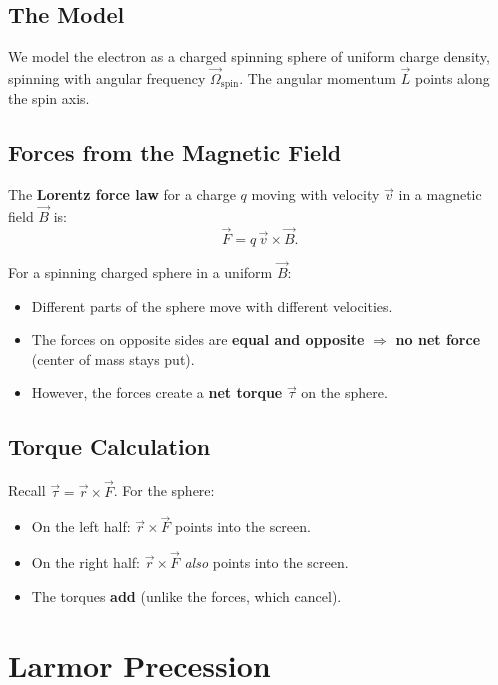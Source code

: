 \documentclass[11pt,a4paper]{article}
\theoremstyle{definition}
\theoremstyle{plain}
\theoremstyle{remark}
\begin{document}
\subsection{The Model}

We model the electron as a charged spinning sphere of uniform charge density, spinning with angular frequency $\vec{\Omega}_{\text{spin}}$. The angular momentum $\vec{L}$ points along the spin axis.

\subsection{Forces from the Magnetic Field}

The \textbf{Lorentz force law} for a charge $q$ moving with velocity $\vec{v}$ in a magnetic field $\vec{B}$ is:
\[
    \vec{F} = q\,\vec{v} \times \vec{B}.
\]

For a spinning charged sphere in a uniform $\vec{B}$:
\begin{itemize}
    \item Different parts of the sphere move with different velocities.
    \item The forces on opposite sides are \textbf{equal and opposite} $\Rightarrow$ \textbf{no net force} (center of mass stays put).
    \item However, the forces create a \textbf{net torque} $\vec{\tau}$ on the sphere.
\end{itemize}

\subsection{Torque Calculation}

Recall $\vec{\tau} = \vec{r} \times \vec{F}$. For the sphere:
\begin{itemize}
    \item On the left half: $\vec{r} \times \vec{F}$ points into the screen.
    \item On the right half: $\vec{r} \times \vec{F}$ \emph{also} points into the screen.
    \item The torques \textbf{add} (unlike the forces, which cancel).
\end{itemize}

\section{Larmor Precession}
\end{document}
